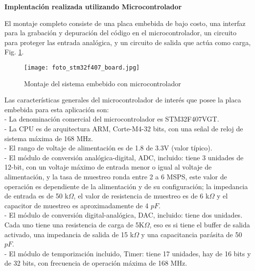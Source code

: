 \documentclass[informe.tex]{subfiles}
\begin{document}
\textbf{Implentación realizada utilizando Microcontrolador}\newline

El montaje completo consiste de una placa embebida de bajo costo, una interfaz para la grabación y depuración del código en el microcontrolador, un circuito para proteger las entrada analógica, y un circuito de salida que actúa como carga, Fig.  \ref{fig:disenio_y_construccion:stm32:board}.

\begin{figure}[h!]
	\centering
	\texttt{[image: foto\_stm32f407\_board.jpg]}	
	\caption{Montaje del sistema embebido con microcontrolador}
	\label{fig:disenio_y_construccion:stm32:board}
	\end{figure}

Las características generales del microcontrolador de interés que posee la placa embebida para esta aplicación son:\\
- La denominación comercial del microcontrolador es STM32F407VGT.\\ 
- La CPU es de arquitectura ARM, Corte-M4-32 bits, con una señal de reloj de sistema máxima de 168 MHz.\\
- El rango de voltaje de alimentación es de 1.8 de 3.3V (valor típico).\\
- El módulo de conversión analógica-digital, ADC, incluido: tiene 3 unidades de 12-bit, con un voltaje máximo de entrada menor o igual al voltaje de alimentación, y la tasa de muestreo ronda entre 2 a 6 MSPS, este valor de operación es dependiente de la alimentación y de su configuración; la impedancia de entrada es de 50 k$\Omega$, el valor de resistencia de muestreo es de 6 k$\Omega$ y el capacitor de muestreo es  aproximadamente de 4 $pF$.\\
- El módulo de conversión digital-analógica, DAC, incluido: tiene dos unidades. Cada uno tiene una resistencia de carga de 5K$\Omega$, eso es si tiene el buffer de salida activado, una impedancia de salida de 15 k$\Omega$ y una capacitancia parásita de 50 $pF$.\\
- El módulo de temporización incluido, Timer: tiene 17 unidades, hay de 16 bits y de 32 bits, con frecuencia de operación máxima de 168 MHz.\\
\end{document}

